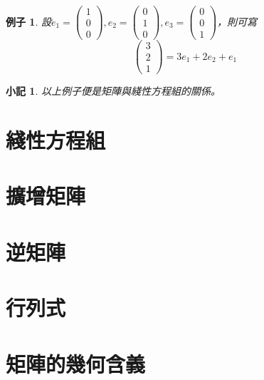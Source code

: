 \documentclass[12pt]{article}
\newtheorem*{remark}{小記}
\newtheorem*{example}{例子}
\begin{document}
    \begin{example}
        設$e_1=\begin{pmatrix}
            1\\0\\0
        \end{pmatrix},e_2=\begin{pmatrix}
            0\\1\\0
        \end{pmatrix},e_3=\begin{pmatrix}
            0\\0\\1
        \end{pmatrix}$，則可寫
            $$\begin{pmatrix}
                3\\2\\1
            \end{pmatrix}=3e_1+2e_2+e_1$$
    \end{example}

    \begin{remark}
        以上例子便是矩陣與綫性方程組的關係。
    \end{remark}

    \section*{綫性方程組}

    \section*{擴增矩陣}

    \section*{逆矩陣}

    \section*{行列式}

    \section*{矩陣的幾何含義}
\end{document}
